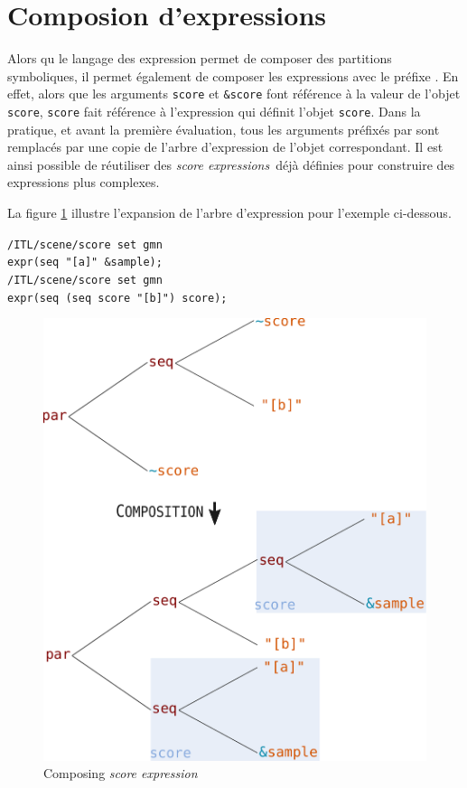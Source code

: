 \documentclass{article}
\newcommand{\OSC}[1]{\texttt{#1}}
\newcommand{\oper}[1]{\textcolor{figRed}{#1}}
\newcommand{\param}[1]{\textcolor{figOrange}{#1}}
\newcommand{\prefix}[1]{\textcolor{figBlue}{#1}}
\newcommand{\sExpr}{\emph{score expression}}
\newcommand{\sExprs}{\emph{score expressions}}
\newcommand{\lowTilde}{\texttildelow}
\newcommand{\tab}{\hspace*{4mm}}
\newcommand{\sample}	[1]			{\vspace{-0.2em}\begin{center}\colorbox{mygrey}{\begin{minipage}[t]{0.97\columnwidth} {\small \texttt{#1}}\end{minipage}}\end{center}}
\begin{document}
\section{Composion d'expressions}
\label{composingExpr}
Alors qu le langage des expression permet de composer des partitions symboliques, il permet également de composer les expressions avec le préfixe  \OSC{\prefix{\lowTilde}}. En effet, alors que les arguments \OSC{\param{score}} et \OSC{\prefix{\&}\param{score}} font référence à la valeur de l'objet \OSC{score}, \OSC{\prefix{\lowTilde}\param{score}} fait référence à l'expression qui définit l'objet \OSC{score}. Dans la pratique, et avant la première évaluation, tous les arguments préfixés par \OSC{\prefix{\lowTilde}} sont remplacés par une copie de l'arbre d'expression de l'objet correspondant. Il est ainsi possible de réutiliser des \sExprs\ déjà définies pour construire des expressions plus complexes.

La figure \ref{fig:expandingTree} illustre l'expansion de l'arbre d'expression pour l'exemple ci-dessous.

\sample{/ITL/scene/score set gmn\\
\tab expr(\oper{seq} \param{"[a]"} \prefix{\&}\param{sample});\\
/ITL/scene/score set gmn  \\
\tab expr(\oper{seq} (\oper{seq} \prefix{\lowTilde}\param{score} \param{"[b]"}) \prefix{\lowTilde}\param{score});
}

\begin{figure}[th]
\centering
\includegraphics[width=0.9\columnwidth]{imgs/expandingTree}
\caption{Composing \sExpr
\label{fig:expandingTree}}
\end{figure}




\balance


\end{document}
